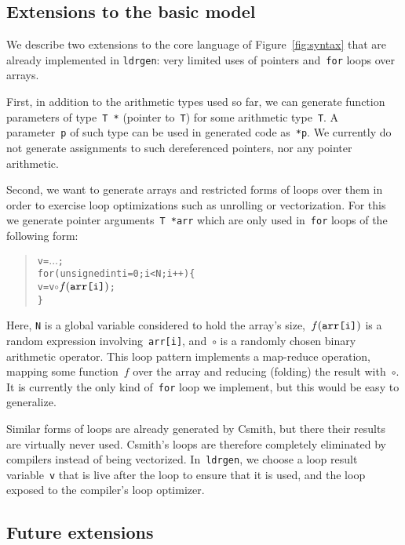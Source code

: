 \documentclass{llncs}
\newcommand\ldrgen{\texttt{ldrgen}}
\begin{document}
\subsection{Extensions to the basic model}
\label{sec:extensions}

We describe two extensions to the core language of Figure~\ref{fig:syntax}
that are already implemented in \ldrgen: very limited uses of pointers
and~\verb|for| loops over arrays.

First, in addition to the arithmetic types used so far, we can generate
function parameters of type~\verb|T *| (pointer to~\verb|T|) for some
arithmetic type~\verb|T|. A parameter~\verb|p| of such type can be used in
generated code as~\verb|*p|. We currently do not generate assignments to
such dereferenced pointers, nor any pointer arithmetic.

Second, we want to generate arrays and restricted forms of loops over them
in order to exercise loop optimizations such as unrolling or vectorization.
For this we generate pointer arguments~\verb|T *arr| which are only
used in~\verb|for| loops of the following form:

\begin{quote}
\begin{alltt}
v = \(\dots\);
for (unsigned int i = 0; i < N; i++) \{
    v = v \(\circ\) \(f(\mbox{\texttt{arr[i]}})\);
\}
\end{alltt}
\end{quote}

Here, \verb|N| is a global variable considered to hold the array's
size,~\(f(\mbox{\texttt{arr[i]}})\) is a random expression
involving~\verb|arr[i]|, and~\(\circ\) is a randomly chosen binary
arithmetic operator. This loop pattern implements a map-reduce operation,
mapping some function~\(f\) over the array and reducing (folding) the result
with~\(\circ\). It is currently the only kind of~\verb|for| loop we
implement, but this would be easy to generalize.

Similar forms of loops are already generated by Csmith, but there their
results are virtually never used. Csmith's loops are therefore completely
eliminated by compilers instead of being vectorized. In~\ldrgen, we choose a
loop result variable~\verb|v| that is live after the loop to ensure that it
is used, and the loop exposed to the compiler's loop optimizer.

\subsection{Future extensions}
\end{document}
